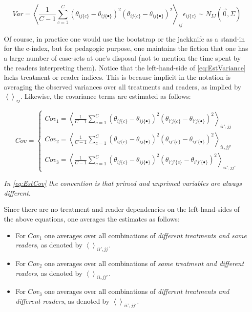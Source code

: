\documentclass[
]{book}
\providecommand{\tightlist}{%
  \setlength{\itemsep}{0pt}\setlength{\parskip}{0pt}}
\begin{document}
\begin{equation}
Var=
\left \langle \frac{1}{C-1}\sum_{c=1}^{C} (\theta_{ij\{c\}}-\theta_{ij\{\bullet\}})^2 (\theta_{ij\{c\}}-\theta_{ij\{\bullet\}})^2 \right \rangle_{ij}
\epsilon_{ij\{c\}} \sim N_{IJ}(\vec{0},\Sigma)
\label{eq:EstVariance}
\end{equation}

Of course, in practice one would use the bootstrap or the jackknife as a stand-in for the c-index, but for pedagogic purpose, one maintains the fiction that one has a large number of case-sets at one's disposal (not to mention the time spent by the readers interpreting them). Notice that the left-hand-side of \eqref{eq:EstVariance} lacks treatment or reader indices. This is because implicit in the notation is averaging the observed variances over all treatments and readers, as implied by \(\left \langle \right \rangle _{ij}\). Likewise, the covariance terms are estimated as follows:

\begin{equation}
Cov=\left\{\begin{matrix}
Cov_1=\left \langle \frac{1}{C-1}\sum_{c=1}^{C} (\theta_{ij\{c\}}-\theta_{ij\{\bullet\}})^2 (\theta_{i'j\{c\}}-\theta_{i'j\{\bullet\}})^2 \right \rangle_{ii',jj}\\ 
Cov_2=\left \langle \frac{1}{C-1}\sum_{c=1}^{C} (\theta_{ij\{c\}}-\theta_{ij\{\bullet\}})^2 (\theta_{ij'\{c\}}-\theta_{ij'\{\bullet\}})^2 \right \rangle_{ii,jj'}\\ 
Cov_3=\left \langle \frac{1}{C-1}\sum_{c=1}^{C} (\theta_{ij\{c\}}-\theta_{ij\{\bullet\}})^2 (\theta_{i'j'\{c\}}-\theta_{i'j'\{\bullet\}})^2 \right \rangle_{ii',jj'}
\end{matrix}\right.
\label{eq:EstCov}
\end{equation}

\emph{In \eqref{eq:EstCov} the convention is that primed and unprimed variables are always different.}

Since there are no treatment and reader dependencies on the left-hand-sides of the above equations, one averages the estimates as follows:

\begin{itemize}
\tightlist
\item
  For \(Cov_1\) one averages over all combinations of \emph{different treatments and same readers}, as denoted by \(\left \langle \right \rangle_{ii',jj}\).
\item
  For \(Cov_2\) one averages over all combinations of \emph{same treatment and different readers}, as denoted by \(\left \langle \right \rangle_{ii,jj'}\).
\item
  For \(Cov_3\) one averages over all combinations of \emph{different treatments and different readers}, as denoted by \(\left \langle \right \rangle_{ii',jj'}\).
\end{itemize}
\end{document}
